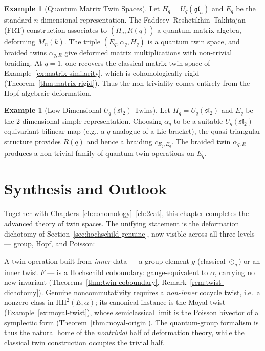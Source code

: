 \documentclass[11pt,a4paper,openany]{book}
\theoremstyle{plain}
\theoremstyle{definition}
\newtheorem{example}[theorem]{Example}
\newcommand{\twing}[1]{\odot_{#1}}
\newcommand{\actspace}{E}
\begin{document}
\begin{example}[Quantum Matrix Twin Spaces]\label{ex:quantum-matrix}
Let $H_q = U_q(\mathfrak{gl}_n)$ and $\actspace_q$ be the standard $n$-dimensional representation. The Faddeev--Reshetikhin--Takhtajan (FRT) construction associates to $(H_q, R(q))$ a quantum matrix algebra, deforming $M_n(k)$. The triple $(\actspace_q, \alpha_q, H_q)$ is a quantum twin space, and braided twins $\alpha_{q,R}$ give deformed matrix multiplications with non-trivial braiding. At $q = 1$, one recovers the classical matrix twin space of Example~\ref{ex:matrix-similarity}, which is cohomologically rigid (Theorem~\ref{thm:matrix-rigid}). Thus the non-triviality comes entirely from the Hopf-algebraic deformation.
\end{example}

\begin{example}[Low-Dimensional $U_q(\mathfrak{sl}_2)$ Twins]\label{ex:quantum-sl2}
Let $H_q = U_q(\mathfrak{sl}_2)$ and $\actspace_q$ be the 2-dimensional simple representation. Choosing $\alpha_q$ to be a suitable $U_q(\mathfrak{sl}_2)$-equivariant bilinear map (e.g., a $q$-analogue of a Lie bracket), the quasi-triangular structure provides $R(q)$ and hence a braiding $c_{\actspace_q, \actspace_q}$. The braided twin $\alpha_{q,R}$ produces a non-trivial family of quantum twin operations on $\actspace_q$.
\end{example}

\section{Synthesis and Outlook}

Together with Chapters~\ref{ch:cohomology}--\ref{ch:2cat}, this chapter completes the advanced theory of twin spaces. The unifying statement is the deformation dichotomy of Section~\ref{sec:hochschild-genuine}, now visible across all three levels --- group, Hopf, and Poisson:

\begin{keyresult}
A twin operation built from \emph{inner} data --- a group element $g$ (classical $\twing{g}$) or an inner twist $F$ --- is a Hochschild coboundary: gauge-equivalent to $\alpha$, carrying no new invariant (Theorems~\ref{thm:twin-coboundary}, Remark~\ref{rem:twist-dichotomy}). Genuine noncommutativity requires a \emph{non-inner} cocycle twist, i.e.\ a nonzero class in $\mathrm{HH}^2(\actspace,\alpha)$; its canonical instance is the Moyal twist (Example~\ref{ex:moyal-twist}), whose semiclassical limit is the Poisson bivector of a symplectic form (Theorem~\ref{thm:moyal-origin}). The quantum-group formalism is thus the natural home of the \emph{nontrivial} half of deformation theory, while the classical twin construction occupies the trivial half.
\end{keyresult}
\end{document}
